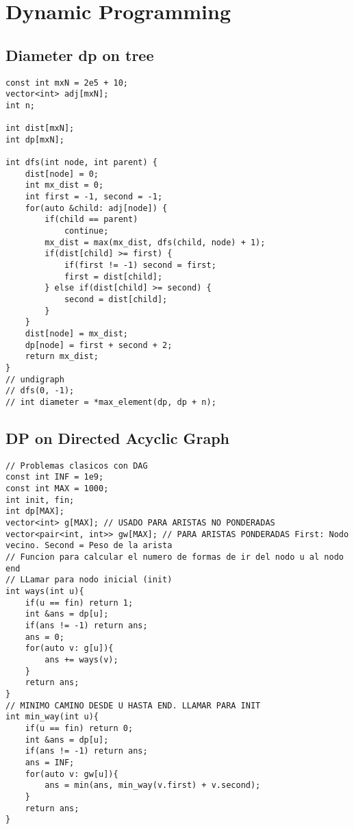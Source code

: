 \documentclass[10pt,letterpaper,twocolumn,twosided]{article}
\begin{document}

\section{Dynamic Programming}

\subsection{Diameter dp on tree}
\begin{lstlisting}
const int mxN = 2e5 + 10;
vector<int> adj[mxN];
int n;
 
int dist[mxN];
int dp[mxN];
 
int dfs(int node, int parent) {
    dist[node] = 0;
    int mx_dist = 0;
    int first = -1, second = -1;
    for(auto &child: adj[node]) {
        if(child == parent)
            continue;
        mx_dist = max(mx_dist, dfs(child, node) + 1);
        if(dist[child] >= first) {
            if(first != -1) second = first;
            first = dist[child];
        } else if(dist[child] >= second) {
            second = dist[child];
        }
    }
    dist[node] = mx_dist;
    dp[node] = first + second + 2;
    return mx_dist;
}
// undigraph
// dfs(0, -1);
// int diameter = *max_element(dp, dp + n);
\end{lstlisting}

\subsection{DP on Directed Acyclic Graph}
\begin{lstlisting}
// Problemas clasicos con DAG
const int INF = 1e9;
const int MAX = 1000;
int init, fin;
int dp[MAX];
vector<int> g[MAX]; // USADO PARA ARISTAS NO PONDERADAS
vector<pair<int, int>> gw[MAX]; // PARA ARISTAS PONDERADAS First: Nodo vecino. Second = Peso de la arista
// Funcion para calcular el numero de formas de ir del nodo u al nodo end
// LLamar para nodo inicial (init)
int ways(int u){
    if(u == fin) return 1;
    int &ans = dp[u];
    if(ans != -1) return ans;
    ans = 0;
    for(auto v: g[u]){
        ans += ways(v);
    }
    return ans;
}
// MINIMO CAMINO DESDE U HASTA END. LLAMAR PARA INIT
int min_way(int u){
    if(u == fin) return 0;
    int &ans = dp[u];
    if(ans != -1) return ans;
    ans = INF;
    for(auto v: gw[u]){
        ans = min(ans, min_way(v.first) + v.second);
    }
    return ans;
}
\end{lstlisting}
\end{document}
